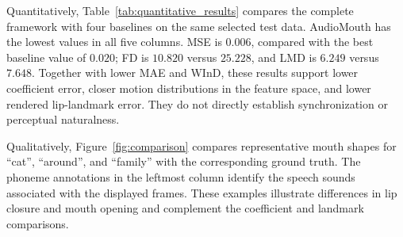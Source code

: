 %
%
%


Quantitatively, Table~\ref{tab:quantitative_results} compares the complete framework with four baselines on the same selected test data. AudioMouth has the lowest values in all five columns. MSE is $0.006$, compared with the best baseline value of $0.020$; FD is $10.820$ versus $25.228$, and LMD is $6.249$ versus $7.648$. Together with lower MAE and WInD, these results support lower coefficient error, closer motion distributions in the feature space, and lower rendered lip-landmark error. They do not directly establish synchronization or perceptual naturalness.

Qualitatively, Figure~\ref{fig:comparison} compares representative mouth shapes for ``cat'', ``around'', and ``family'' with the corresponding ground truth. The phoneme annotations in the leftmost column identify the speech sounds associated with the displayed frames. These examples illustrate differences in lip closure and mouth opening and complement the coefficient and landmark comparisons.



